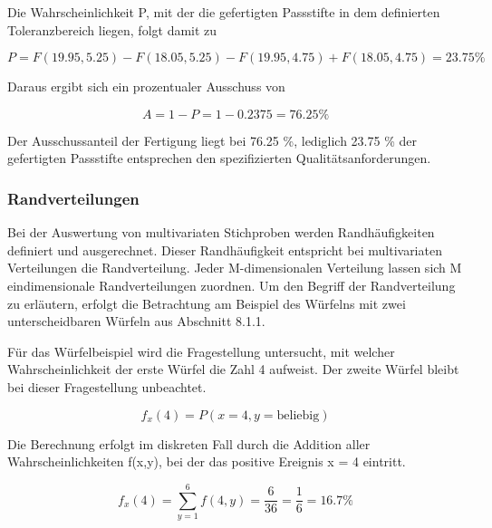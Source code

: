 \noindent Die Wahrscheinlichkeit P, mit der die gefertigten Passstifte in dem definierten Toleranzbereich liegen, folgt damit zu

\begin{equation}\label{eq:eightthirteen}
P=F(19.95,5.25)-F(18.05,5.25)-F(19.95,4.75)+F(18.05,4.75)= 23.75\%
\end{equation}

\noindent Daraus ergibt sich ein prozentualer Ausschuss von

\begin{equation}\label{eq:eightfourteen}
A=1-P=1-0.2375=76.25\% 
\end{equation}

\noindent Der Ausschussanteil der Fertigung liegt bei 76.25 \%, lediglich 23.75 \% der gefertigten Passstifte entsprechen den spezifizierten Qualit\"{a}tsanforderungen. 

\subsubsection{Randverteilungen}

\noindent Bei der Auswertung von multivariaten Stichproben werden Randh\"{a}ufigkeiten definiert und ausgerechnet. Dieser Randh\"{a}ufigkeit entspricht bei multivariaten Verteilungen die Randverteilung. Jeder M-dimensionalen Verteilung lassen sich M eindimensionale Randverteilungen zuordnen. Um den Begriff der Randverteilung zu erl\"{a}utern, erfolgt die Betrachtung am Beispiel des W\"{u}rfelns mit zwei unterscheidbaren W\"{u}rfeln aus Abschnitt 8.1.1.\newline

\noindent F\"{u}r das W\"{u}rfelbeispiel wird die Fragestellung untersucht, mit welcher Wahrscheinlichkeit der erste W\"{u}rfel die Zahl 4 aufweist. Der zweite W\"{u}rfel bleibt bei dieser Fragestellung unbeachtet.

\begin{equation}\label{eq:eightfifteen}
f_{x}(4)=P(x=4,y=\text{beliebig})
\end{equation}

\noindent Die Berechnung erfolgt im diskreten Fall durch die Addition aller Wahrscheinlichkeiten f(x,y), bei der das positive Ereignis x = 4 eintritt. 

\begin{equation}\label{eq:eightsixteen}
f_{x}(4)=\sum _{y=1}^{6}f(4,y) =\dfrac{6}{36} =\dfrac{1}{6} =16.7\% 
\end{equation}

